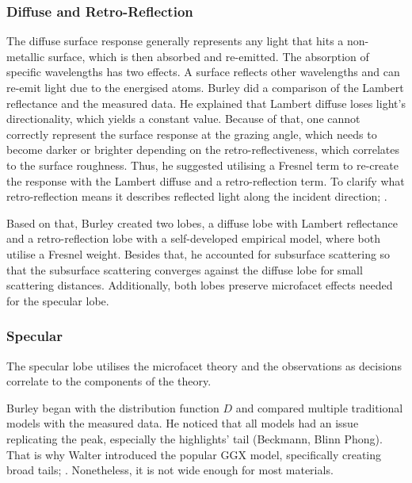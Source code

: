 \subsubsection*{Diffuse and Retro-Reflection}

The diffuse surface response generally represents any light that hits a non-metallic surface, which is then absorbed and re-emitted.
The absorption of specific wavelengths has two effects.
A surface reflects other wavelengths and can re-emit light due to the energised atoms.
Burley did a comparison \cite{burley_physically_2012} of the Lambert reflectance \cite{lambert_lamberts_1892} and the measured data.
He explained that Lambert diffuse loses light's directionality, which yields a constant value.
Because of that, one cannot correctly represent the surface response at the grazing angle, which needs to become darker or brighter depending on the retro-reflectiveness, which correlates to the surface roughness.
Thus, he suggested utilising a Fresnel term to re-create the response with the Lambert diffuse and a retro-reflection term.
To clarify what retro-reflection means it describes reflected light along the incident direction; \cite{berns_event_2021}.

Based on that, Burley \cite{burley_extending_2015} created two lobes, a diffuse lobe with Lambert reflectance and a retro-reflection lobe with a self-developed empirical model, where both utilise a Fresnel weight.
Besides that, he accounted for subsurface scattering so that the subsurface scattering converges against the diffuse lobe for small scattering distances.
Additionally, both lobes preserve microfacet effects needed for the specular lobe. 

\subsubsection*{Specular}

The specular lobe utilises the microfacet theory and the observations as decisions correlate to the components of the theory.

Burley \cite{burley_physically_2012} began with the distribution function $D$ and compared multiple traditional models with the measured data.
He noticed that all models had an issue replicating the peak, especially the highlights' tail (Beckmann, Blinn Phong).
That is why Walter introduced the popular GGX model, specifically creating broad tails; \cite{walter_microfacet_2007}.
Nonetheless, it is not wide enough for most materials.

